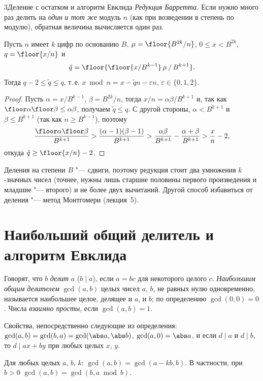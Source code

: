 \begin{lecture}{3}{Деление с остатком и алгоритм Евклида}
\emph{Редукция Барретта.} Если нужно много раз делить на \emph{один и тот же} модуль $n$ (как при
возведении в степень по модулю), обратная величина вычисляется один раз.

\begin{proposition}[Барретт]\label{l3:barrett}
Пусть $n$ имеет $k$ цифр по основанию $B$, $\mu = \floor{B^{2k}/n}$, $0 \le x < B^{2k}$, $q = \floor{x/n}$ и
\[
  \tilde q = \floor{\floor{x / B^{k-1}} \, \mu \, / \, B^{k+1}}.
\]
Тогда $q - 2 \le \tilde q \le q$, т.\,е. $x \bmod n = x - \tilde q n - \varepsilon n$,
$\varepsilon \in \{0, 1, 2\}$.
\end{proposition}

\begin{proof}
Пусть $\alpha = x/B^{k-1}$, $\beta = B^{2k}/n$, тогда $x/n = \alpha\beta / B^{k+1}$ и, так как
$\floor\alpha \floor\beta \le \alpha\beta$, получаем $\tilde q \le q$. С другой стороны,
$\alpha < B^{k+1}$ и $\beta \le B^{k+1}$ (так как $n \ge B^{k-1}$), поэтому
\[
  \frac{\floor\alpha \floor\beta}{B^{k+1}} > \frac{(\alpha - 1)(\beta - 1)}{B^{k+1}}
  > \frac{\alpha\beta}{B^{k+1}} - \frac{\alpha + \beta}{B^{k+1}} > \frac{x}{n} - 2,
\]
откуда $\tilde q \ge \floor{x/n} - 2$.
\end{proof}

Деления на степени $B$ "--- сдвиги, поэтому редукция стоит два умножения $k$-значных чисел
(точнее, нужны лишь старшие половины первого произведения и младшие "--- второго) и не более двух
вычитаний. Другой способ избавиться от деления "--- метод Монтгомери (лекция~5).

\section{Наибольший общий делитель и алгоритм Евклида}

Говорят, что $b$ \emph{делит} $a$ ($b \mid a$), если $a = bc$ для некоторого целого $c$.
\emph{Наибольшим общим делителем} $\gcd(a, b)$ целых чисел $a$, $b$, не равных нулю
одновременно, называется наибольшее целое, делящее и $a$, и $b$; по определению
$\gcd(0, 0) = 0$. Числа \emph{взаимно просты}, если $\gcd(a, b) = 1$.

Свойства, непосредственно следующие из определения: $\gcd(a, b) = \gcd(b, a) = \gcd(\abs a, \abs b)$,
$\gcd(a, 0) = \abs a$, и если $d \mid a$ и $d \mid b$, то $d \mid ax + by$ при любых целых $x$, $y$.

\begin{lemma}\label{l3:gcd-step}
Для любых целых $a$, $b$, $k$: $\gcd(a, b) = \gcd(a - kb, b)$. В частности, при $b > 0$
$\gcd(a, b) = \gcd(b, a \bmod b)$.
\end{lemma}


\end{lecture}
